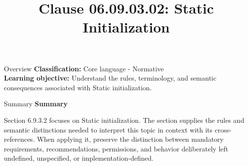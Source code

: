 \documentclass[10pt,letterpaper]{article}
\title{Clause 06.09.03.02: Static Initialization}
\author{}
\date{}
\begin{document}
\maketitle
\begin{CornellOverviewBox}{Overview}
\textbf{Classification:} Core language - Normative\\[2pt]
\textbf{Learning objective:} Understand the rules, terminology, and semantic consequences associated with Static initialization.
\end{CornellOverviewBox}\begin{CornellSummaryBox}{Summary}
{\sffamily\bfseries\color{Accent} Summary}\par\vspace{3pt}Section 6.9.3.2 focuses on Static initialization. The section supplies the rules and semantic distinctions needed to interpret this topic in context with its cross-references. When applying it, preserve the distinction between mandatory requirements, recommendations, permissions, and behavior deliberately left undefined, unspecified, or implementation-defined.
\end{CornellSummaryBox}
\end{document}
